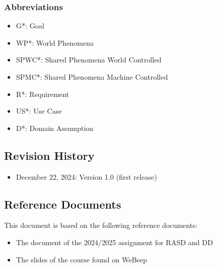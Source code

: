     \subsubsection{Abbreviations}
        \begin{itemize}
            \item {G*: Goal}
            \item {WP*: World Phenomena}
            \item {SPWC*: Shared Phenomena World Controlled}
            \item {SPMC*: Shared Phenomena Machine Controlled}
            \item {R*: Requirement}
            \item {US*: Use Case}
            \item {D*: Domain Assumption}
        \end{itemize}


\subsection{Revision History}
    \begin{itemize}
        \item {December 22, 2024: Version 1.0 (first release)}
    \end{itemize}


\subsection{Reference Documents}
    This document is based on the following reference documents:
    \begin{itemize}
        \item {The document of the 2024/2025 assignment for RASD and DD }
        \item {The slides of the course found on WeBeep}
    \end{itemize}


